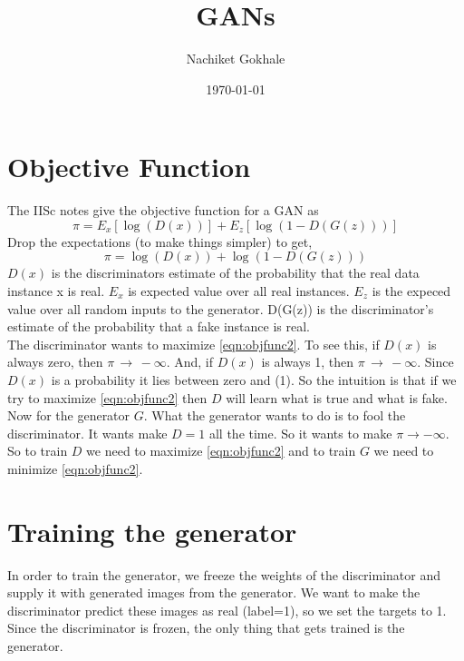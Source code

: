 \documentclass{article}
\newcommand{\beq}{\begin{equation}}
\newcommand{\eeq}{\end{equation}}
\begin{document}
\title{GANs}
\author{Nachiket Gokhale}
\date{\today}
\maketitle
\section{Objective Function}
The IISc notes give the objective function for a GAN as
%
\beq
\label{eqn:objfunc}
\pi = E_x[\log(D(x))] + E_z[\log(1-D(G(z)))]
\eeq
Drop the expectations (to make things simpler) to get,
\beq
\label{eqn:objfunc2}
\pi =\log(D(x)) + \log(1-D(G(z)))
\eeq
%
$D(x)$ is the discriminators estimate of the probability that the real data instance x is real. $E_x$ is expected value over all real instances. $E_z$ is the expeced value over all random inputs to the generator. D(G(z)) is the discriminator's estimate of the probability that a fake instance is real.\\

The discriminator wants to maximize \ref{eqn:objfunc2}. To see this, if $D(x)$ is always zero, then $\pi\,\rightarrow\,-\infty$. And, if $D(x)$ is always 1, then $\pi\,\rightarrow\,-\infty$. Since $D(x)$ is a probability it lies between zero and (1). So the intuition is that if we try to maximize  \ref{eqn:objfunc2} then $D$ will learn what is true and what is fake. \\

Now for the generator $G$. What the generator wants to do is to fool the discriminator. It wants make $D = 1$ all the time. So it wants to make $\pi\rightarrow{-\infty}$.\\

So to train $D$ we need to maximize \ref{eqn:objfunc2} and to train $G$ we need to minimize \ref{eqn:objfunc2}.\

\section{Training the generator}
In order to train the generator, we freeze the weights of the discriminator and supply it with generated images from the generator. We want to make the discriminator predict these images as real (label=1), so we set the targets to 1. Since the discriminator is frozen, the only thing that gets trained is the generator.
\end{document}
